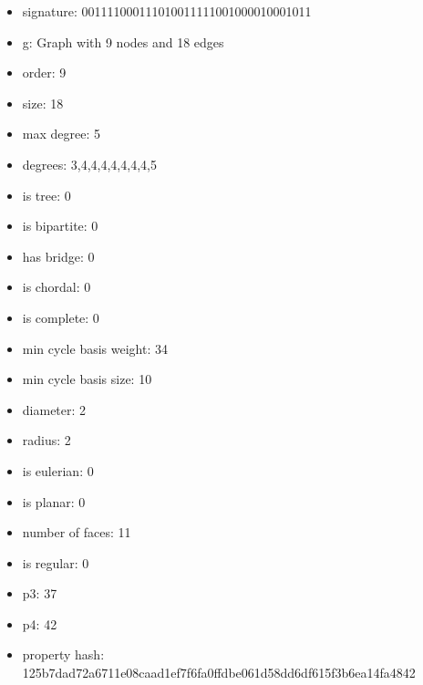 \newpage
\begin{figure}
\end{figure}
\begin{itemize}
\item signature: 001111000111010011111001000010001011
\item g: Graph with 9 nodes and 18 edges
\item order: 9
\item size: 18
\item max degree: 5
\item degrees: 3,4,4,4,4,4,4,4,5
\item is tree: 0
\item is bipartite: 0
\item has bridge: 0
\item is chordal: 0
\item is complete: 0
\item min cycle basis weight: 34
\item min cycle basis size: 10
\item diameter: 2
\item radius: 2
\item is eulerian: 0
\item is planar: 0
\item number of faces: 11
\item is regular: 0
\item p3: 37
\item p4: 42
\item property hash: 125b7dad72a6711e08caad1ef7f6fa0ffdbe061d58dd6df615f3b6ea14fa4842
\end{itemize}
